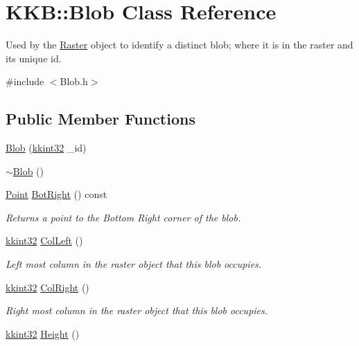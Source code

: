 \hypertarget{class_k_k_b_1_1_blob}{}\section{K\+KB\+:\+:Blob Class Reference}
\label{class_k_k_b_1_1_blob}


Used by the \hyperlink{class_k_k_b_1_1_raster}{Raster} object to identify a distinct blob; where it is in the raster and its unique id.  




{\ttfamily \#include $<$Blob.\+h$>$}

\subsection*{Public Member Functions}
\begin{DoxyCompactItemize}
\item 
\hyperlink{class_k_k_b_1_1_blob_a7e4af0a2e14df5a0672bcbcb18089320}{Blob} (\hyperlink{namespace_k_k_b_a8fa4952cc84fda1de4bec1fbdd8d5b1b}{kkint32} \+\_\+id)
\item 
\hyperlink{class_k_k_b_1_1_blob_a8a8d34c9112cb907fdffcb5dbd2dd244}{$\sim$\+Blob} ()
\item 
\hyperlink{class_k_k_b_1_1_point}{Point} \hyperlink{class_k_k_b_1_1_blob_a6df3799b92a5c54cb5b805936cfd6b2b}{Bot\+Right} () const 
\begin{DoxyCompactList}\small\item\em Returns a point to the Bottom Right corner of the blob. \end{DoxyCompactList}\item 
\hyperlink{namespace_k_k_b_a8fa4952cc84fda1de4bec1fbdd8d5b1b}{kkint32} \hyperlink{class_k_k_b_1_1_blob_a42dc8a4c5009bcc67cbc39848169559a}{Col\+Left} ()
\begin{DoxyCompactList}\small\item\em Left most column in the raster object that this blob occupies. \end{DoxyCompactList}\item 
\hyperlink{namespace_k_k_b_a8fa4952cc84fda1de4bec1fbdd8d5b1b}{kkint32} \hyperlink{class_k_k_b_1_1_blob_a9ae87430e9269e0fbfcd88a2d5891b88}{Col\+Right} ()
\begin{DoxyCompactList}\small\item\em Right most column in the raster object that this blob occupies. \end{DoxyCompactList}\item 
\hyperlink{namespace_k_k_b_a8fa4952cc84fda1de4bec1fbdd8d5b1b}{kkint32} \hyperlink{class_k_k_b_1_1_blob_aa38a04e912ff9abf0abb950a69b65955}{Height} ()

\end{DoxyCompactItemize}
